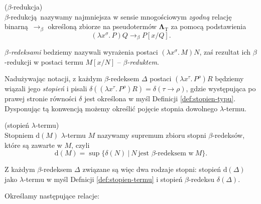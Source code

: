 \begin{definicja}(\(\beta\)-redukcja)\\
  \(\beta\)-redukcją nazywamy najmniejsza w sensie mnogościowym \emph{zgodną} relację binarną \(\longrightarrow_{\beta}\) określoną zbiorze na pseudotermów \(\mathbf{\Lambda}_{\mathrm{T}}\) za pomocą podstawienia
  \[
    (\lambda x^\sigma.\,P)Q \longrightarrow_{\beta} P[x/Q].
  \]

  \emph{\(\beta\)-redeksami} bedziemy nazywali wyrażenia postaci \((\lambda x^\sigma.\, M)N\), zaś rezultat ich \(\beta\)-redukcji w postaci termu \(M[x/N]\) -- \emph{\(\beta\)-reduktem}.

  Nadużywając notacji, z każdym \(\beta\)-redeksem \(\Delta\) postaci \((\lambda x^\tau .\,P^\rho)R\) będziemy wiązali jego \emph{stopień} i pisali \(\delta((\lambda x^\tau .\,P^\rho)R)=\delta(\tau\to\rho)\), gdzie występująca po prawej stronie równości \(\delta\) jest określona w myśl Definicji \ref{def:stopien-typu}. Dysponując tą konwencją możemy określić pojęcie stopnia dowolnego \(\lambda\)-termu.

\begin{definicja}\label{def:stopien-termu}(stopień \(\lambda\)-termu)\\
  Stopniem \(\mathrm{d}(M)\) \(\lambda\)-termu \(M\) nazywamy supremum zbioru stopni \(\beta\)-redeksów, które są zawarte w \(M\), czyli
  \[\mathrm{d}(M)=\sup\{\delta(N) \:|\:N\ \text{jest \(\beta\)-redeksem w}\ M\}.\]
\end{definicja}

\begin{uwaga*}
  Z każdym \(\beta\)-redeksem \(\Delta\) związane są więc dwa rodzaje stopni: stopień \(\mathrm{d}(\Delta)\) jako \(\lambda\)-termu w myśl Defnicji \ref{def:stopien-termu} i stopień \(\beta\)-redeksu \(\delta(\Delta)\).
\end{uwaga*}

%

\end{definicja}
\noindent Określamy następujące relacje:

